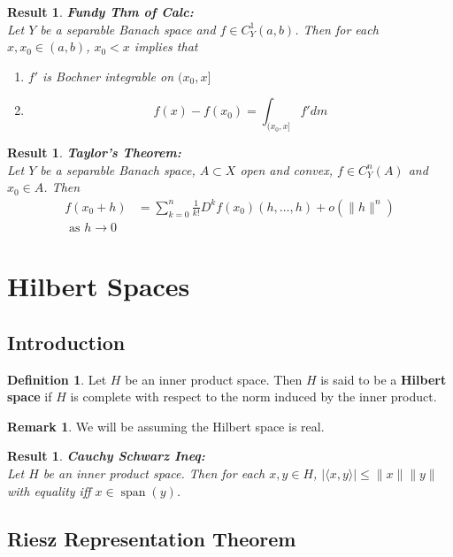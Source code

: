 \documentclass[twoside]{article}
\newtheorem{res}[thm]{Result}
\theoremstyle{definition}
\newtheorem{defn}[definition]{Definition}
\theoremstyle{definition}
\newtheorem{rem}[definition]{Remark}
\renewcommand{\r}{\rangle}
\renewcommand{\l}{\langle}
\DeclareMathOperator{\spn}{span}
\begin{document}
\begin{res}\textbf{Fundy Thm of Calc:}\\
Let $Y$ be a separable Banach space and $f \in C^1_Y(a,b)$. Then for each $x, x_0 \in (a,b)$, $x_0 < x$ implies that 
	\begin{enumerate}
	\item $f'$ is Bochner integrable on $(x_0, x]$ 
	\item  $$f(x) - f(x_0) = \int_{(x_0, x]}f'dm$$ 
	\end{enumerate}
\end{res}

\begin{res}\textbf{Taylor's Theorem:}\\
Let $Y$ be a separable Banach space, $A \subset X$ open and convex, $f\in C^n_Y(A)$ and $x_0 \in A$. Then 
\begin{align*}
f(x_0 + h) &= \sum_{k=0}^n \frac{1}{k!} D^k f(x_0)(h, \dots, h) + o(\|h\|^n)\\ \text{ as } h \rightarrow 0
\end{align*}
\end{res}

\section{Hilbert Spaces} 

\subsection{Introduction}

\begin{defn}
Let $H$ be an inner product space. Then $H$ is said to be a \textbf{Hilbert space} if $H$ is complete with respect to the norm induced by the inner product.
\end{defn}


\begin{rem}
We will be assuming the Hilbert space is real. 
\end{rem}


\begin{res}\textbf{Cauchy Schwarz Ineq:}\\
Let $H$ be an inner product space. Then for each $x,y \in H$, $|\l x, y\r| \leq \|x\| \|y\|$ with equality iff $x \in \spn(y)$.
\end{res}

\subsection{Riesz Representation Theorem}
\end{document}
